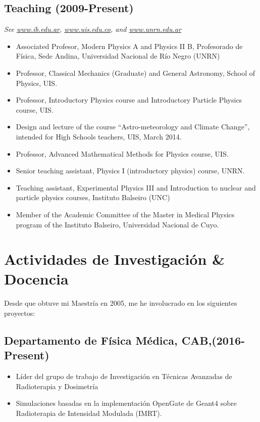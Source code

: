 \subsection*{Teaching (2009-Present)}
{\small{\textit{See \href{http://www.ib.edu.ar}{www.ib.edu.ar}, \href{http://www.uis.edu.co}{www.uis.edu.co}, and \href{http://www.unrn.edu.ar}{www.unrn.edu.ar}}}}
\begin{itemize}
\item Associated Profesor, Modern Physics A and Physics II B, Profesorado de Física, Sede Andina, Universidad Nacional de Río Negro (UNRN)
\item Professor, Classical Mechanics (Graduate) and General Astronomy, School of Physics, UIS.
\item Professor, Introductory Physics course and Introductory Particle Physics course, UIS.
\item Design and lecture of the course ``Astro-meteorology and Climate Change'', intended for High Schools teachers, UIS, March 2014.
\item Professor, Advanced Mathematical Methods for Physics course, UIS.
\item Senior teaching assistant, Physics I (introductory physics) course, UNRN.
\item Teaching assistant, Experimental Physics III and Introduction to nuclear
and particle physics courses, Instituto Balseiro (UNC)
\item Member of the Academic Committee of the Master in Medical Physics program of the Instituto Balseiro, Universidad Nacional de Cuyo.
\end{itemize}
\else
\section*{Actividades de Investigación \& Docencia}

Desde que obtuve mi Maestría en 2005, me he involucrado en los siguientes proyectos:

\subsection*{Departamento de Física Médica, CAB,(2016-Present)}
\begin{itemize}
	\item Líder del grupo de trabajo de Investigación en Técnicas Avanzadas de
		Radioterapia y Dosimetría
	\item Simulaciones basadas en la implementación OpenGate de Geant4 sobre
		Radioterapia de Intensidad Modulada (IMRT).
\end{itemize}

